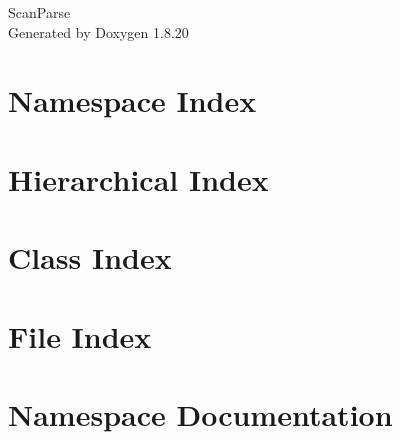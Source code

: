 \let\mypdfximage\pdfximage\def\pdfximage{\immediate\mypdfximage}\documentclass[twoside]{book}
\newcommand{\+}{\discretionary{\mbox{\scriptsize$\hookleftarrow$}}{}{}}
\newcommand{\clearemptydoublepage}{%
  \newpage{\pagestyle{empty}\cleardoublepage}%
}
\begin{document}
\hypersetup{pageanchor=false,
             bookmarksnumbered=true,
             pdfencoding=unicode
            }
\begin{titlepage}
\vspace*{7cm}
\begin{center}%
{\Large Scan\+Parse }\\
\vspace*{1cm}
{\large Generated by Doxygen 1.8.20}\\
\end{center}
\end{titlepage}
\clearemptydoublepage
{}
\tableofcontents
\clearemptydoublepage
{}
\hypersetup{pageanchor=true}

\chapter{Namespace Index}

\chapter{Hierarchical Index}

\chapter{Class Index}

\chapter{File Index}

\chapter{Namespace Documentation}
















\end{document}
